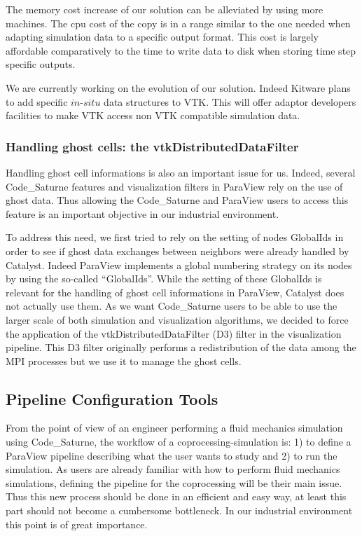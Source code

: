 The memory cost increase of our solution can be  alleviated by using more
machines. The cpu cost of the copy is in a range similar to the one needed when
adapting simulation data to a specific output format. This cost is largely
affordable comparatively to the time to write data to disk when storing time
step specific outputs. 

We are currently working on the evolution of our solution. Indeed Kitware plans to
add specific $in$-$situ$ data structures to VTK. This will offer adaptor
developers facilities to make VTK access non VTK compatible simulation data. 

\subsubsection{Handling ghost cells: the vtkDistributedDataFilter}
Handling ghost cell informations is also an important issue for us. Indeed,
several Code\_Saturne features and visualization filters in ParaView rely on the
use of ghost data. Thus allowing the Code\_Saturne and ParaView users to access
this feature is an important objective in our industrial environment.

To address this need, we first tried to rely on the setting of nodes GlobalIds
in order to see if ghost data exchanges between neighbors were already handled
by Catalyst. Indeed ParaView implements a global numbering strategy on its
nodes by using the so-called “GlobalIds”.  While the setting of these GlobalIds
is relevant for the handling of ghost cell informations in ParaView, Catalyst
does not actually use them. As we want Code\_Saturne users to be able to use the
larger scale of both simulation and visualization algorithms, we decided to
force the application of the vtkDistributedDataFilter (D3) filter in the
visualization pipeline. This D3 filter originally performs a redistribution of
the data among the MPI processes but we use it to manage the ghost cells. 

\subsection{Pipeline Configuration Tools}
\label{sec:pip_conf_tools}
From the point of view of an engineer performing a fluid mechanics simulation
using Code\_Saturne, the workflow of a coprocessing-simulation is: 1) to define
a ParaView pipeline describing what the user wants to study and 2) to run the
simulation. As users are already familiar with how to perform fluid mechanics
simulations, defining the pipeline for the coprocessing will be their main
issue. Thus this new process should be done in an efficient and easy way, at
least this part should not become a cumbersome bottleneck. In our industrial
environment this point is of great importance.

